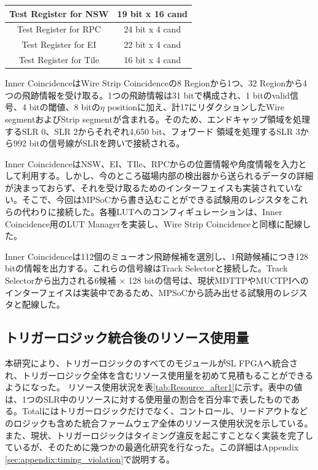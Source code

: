 \begin{table}[]
\begin{tabular}{|c|c|}
    Test Register for NSW                    & 19 bit x 16 cand                                                                                                               \\ \hline
    Test Register for RPC                    & 24 bit x 4 cand                                                                                                                \\ \hline
    Test Register for EI                     & 22 bit x 4 cand                                                                                                                \\ \hline
    Test Register for Tile                   & 16 bit x 4 cand                                                                                                                \\ \hline
    \end{tabular}
\end{table}

Inner CoincidenceはWire Strip Coincidenceの8 Regionから1つ、32 Regionから4つの飛跡情報を受け取る。1つの飛跡情報は31 bitで構成され、1 bitのvalid信号、4 bitの\pt 閾値、8 bitの$\eta$ positionに加え、計17にリダクションしたWire segmentおよびStrip segmentが含まれる。そのため、エンドキャップ領域を処理するSLR 0、SLR 2からそれぞれ4,650 bit、フォワード 領域を処理するSLR 3から992 bitの信号線がSLRを跨いで接続される。

Inner CoincidenceはNSW、EI、TIle、RPCからの位置情報や角度情報を入力として利用する。しかし、今のところ磁場内部の検出器から送られるデータの詳細が決まっておらず、それを受け取るためのインターフェイスも実装されていない。そこで、今回はMPSoCから書き込むことができる試験用のレジスタをこれらの代わりに接続した。各種LUTへのコンフィギュレーションは、Inner Coincidence用のLUT Managerを実装し、Wire Strip Coincidenceと同様に配線した。

Inner Coincidenceは112個のミューオン飛跡候補を選別し、1飛跡候補につき128 bitの情報を出力する。これらの信号線はTrack Selectorと接続した。Track Selectorから出力される6候補 $\times$ 128 bitの信号は、現状MDTTPやMUCTPIへのインターフェイスは実装中であるため、MPSoCから読み出せる試験用のレジスタと配線した。

\subsection{トリガーロジック統合後のリソース使用量}

本研究により、トリガーロジックのすべてのモジュールがSL FPGAへ統合され、トリガーロジック全体を含むリソース使用量を初めて見積もることができるようになった。
リソース使用状況を表\ref{tab:Resource_after1}に示す。表中の値は、1つのSLR中のリソースに対する使用量の割合を百分率で表したものである。Totalにはトリガーロジックだけでなく、コントロール、リードアウトなどのロジックも含めた統合ファームウェア全体のリソース使用状況を示している。
また、現状、トリガーロジックはタイミング違反を起こすことなく実装を完了しているが、そのために幾つかの最適化研究を行なった。この詳細はAppendix \ref{sec:appendix:timing_violation}で説明する。

